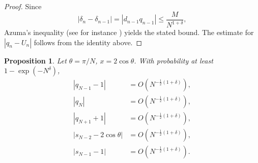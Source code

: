 \documentclass{amsart}
\newtheorem{prop}{Proposition}
\theoremstyle{remark}
\theoremstyle{definition}
\begin{document}
\begin{proof}
Since
\[
|\delta_n-\delta_{n-1}|
=|d_{n-1}q_{n-1}|
\le \frac{M}{N^{1+\delta}},
\]
Azuma's inequality (see for instance \cite{AlonSpencer}) yields the stated bound.  
The estimate for $|q_n-U_n|$ follows from the identity above.
\end{proof}

\begin{prop}\label{prop:randombigO}
Let $\theta=\pi/N$, $x=2\cos\theta$.  
With probability at least $1-\exp(-N^\delta)$,
\begin{align*}
|q_{N-1}-1| &= O\!\left(N^{-\frac12(1+\delta)}\right),\\
|q_{N}| &= O\!\left(N^{-\frac12(1+\delta)}\right),\\
|q_{N+1}+1| &= O\!\left(N^{-\frac12(1+\delta)}\right),\\
|s_{N-2}-2\cos\theta| &= O\!\left(N^{-\frac12(1+\delta)}\right),\\
|s_{N-1}-1| &= O\!\left(N^{-\frac12(1+\delta)}\right).
\end{align*}
\end{prop}
\end{document}
